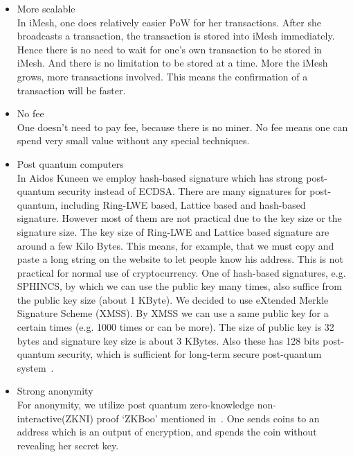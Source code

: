 \documentclass[a4paper,10pt,twocolumn]{article}
\begin{document}
\vspace{-0.5\baselineskip}
\begin{itemize}
	\setlength\itemsep{0em}
	\item{More scalable}\mbox{}\\ 
In iMesh, one does relatively easier PoW for her transactions. 
After she broadcasts a transaction, the transaction is stored into iMesh immediately.
Hence there is no need to wait for one's own transaction to be stored in iMesh.
And there is no limitation to be stored at a time.
More the iMesh grows, more transactions involved. This means the confirmation of a transaction will be faster.

\item{No fee}\mbox{}\\ 
One doesn't need to pay fee, because there is no miner. No fee means one can spend very small value without
any special techniques.

\item{Post quantum computers}\mbox{}\\ 
In Aidos Kuneen we employ hash-based signature which has strong post-quantum security instead of ECDSA.
There are many signatures for post-quantum, including Ring-LWE based, Lattice based and hash-based signature.
However most of them are not practical due to the key size or the signature size.
The key size of Ring-LWE and Lattice based signature are around a few Kilo Bytes. This means, for example, that we 
must copy and paste a long string on the website to let people know his address. This is not practical for normal use of cryptocurrency.
One of hash-based signatures, e.g. SPHINCS, by which we can use the public key many times, also suffice from the public key size (about 1 KByte).
We decided to use eXtended Merkle Signature Scheme (XMSS). By XMSS we can use a same public key for a certain times (e.g. 1000 times or can be more).
The size of public key is 32 bytes and signature key size is about 3 KBytes.
Also these has 128 bits post-quantum security, which is sufficient for long-term secure post-quantum system~\cite{recom}.

\item{Strong anonymity}\mbox{}\\ 
For anonymity, we utilize post quantum zero-knowledge non-interactive(ZKNI) proof `ZKBoo' mentioned in~\cite{zkboo}.
One sends coins to an address which is an output of encryption, and spends the coin without revealing her secret key.
\end{itemize}
\end{document}
